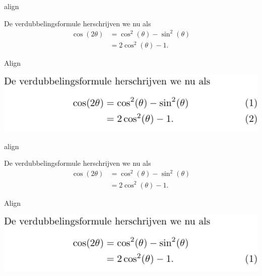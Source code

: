 \documentclass[presentatie.tex]{subfiles}
\begin{document}
\begin{saveblock}{align}
	\begin{highlightblock}[gobble=8,linewidth=\textwidth,
		framexleftmargin=0.25em,xleftmargin=0.25em]
		De verdubbelingsformule herschrijven we nu als
		\begin{align}
			\cos(2\theta) &= \cos^2(\theta) - \sin^2(\theta)\\
			&= 2\cos^2(\theta)-1.
		\end{align}
	\end{highlightblock}
\end{saveblock}

\begin{frame}{Align}

	\includegraphics[width=\linewidth,height=0.4\textheight,keepaspectratio]{assets/5_Formules/mathAlignDoubleNumber.pdf}
\end{frame}


\begin{saveblock}{align}
	\begin{highlightblock}[gobble=8,linewidth=\textwidth,
		framexleftmargin=0.25em,xleftmargin=0.25em]
		De verdubbelingsformule herschrijven we nu als
		\begin{align}
			\cos(2\theta) &= \cos^2(\theta) - \sin^2(\theta)
			\nonumber\\
			&= 2\cos^2(\theta)-1.
		\end{align}
	\end{highlightblock}
\end{saveblock}


\begin{frame}{Align}

	\includegraphics[width=\linewidth,height=0.4\textheight,keepaspectratio]{assets/5_Formules/mathAlignSecondNumbered.pdf}
\end{frame}
\end{document}
